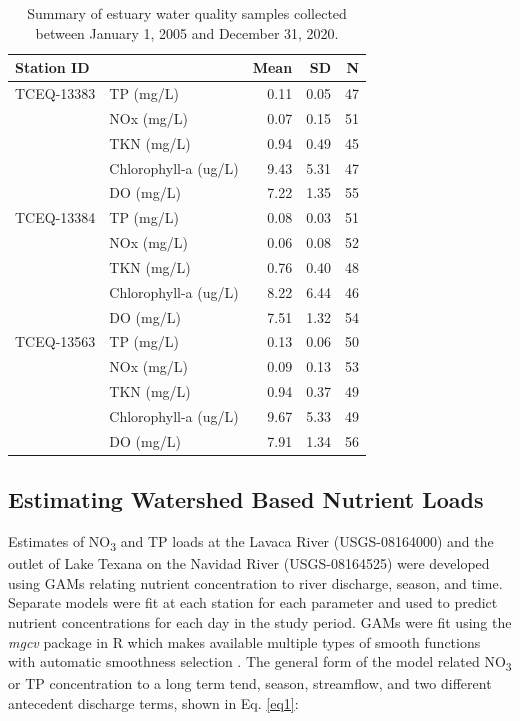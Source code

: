 \documentclass[sn-basic,referee,lineno,pdflatex]{sn-jnl}
\begin{document}
\begin{table}

\caption{\label{tab:table2}Summary of estuary water quality samples collected between January 1, 2005 and December 31, 2020.}
\centering
\begin{tabular}[t]{llrrr}
\toprule
Station ID &   & Mean & SD & N\\
\midrule
TCEQ-13383 & TP (mg/L) & \num{0.11} & \num{0.05} & 47\\
 & NOx (mg/L) & \num{0.07} & \num{0.15} & 51\\
 & TKN (mg/L) & \num{0.94} & \num{0.49} & 45\\
 & Chlorophyll-a (ug/L) & \num{9.43} & \num{5.31} & 47\\
 & DO (mg/L) & \num{7.22} & \num{1.35} & 55\\
TCEQ-13384 & TP (mg/L) & \num{0.08} & \num{0.03} & 51\\
 & NOx (mg/L) & \num{0.06} & \num{0.08} & 52\\
 & TKN (mg/L) & \num{0.76} & \num{0.40} & 48\\
 & Chlorophyll-a (ug/L) & \num{8.22} & \num{6.44} & 46\\
 & DO (mg/L) & \num{7.51} & \num{1.32} & 54\\
TCEQ-13563 & TP (mg/L) & \num{0.13} & \num{0.06} & 50\\
 & NOx (mg/L) & \num{0.09} & \num{0.13} & 53\\
 & TKN (mg/L) & \num{0.94} & \num{0.37} & 49\\
 & Chlorophyll-a (ug/L) & \num{9.67} & \num{5.33} & 49\\
 & DO (mg/L) & \num{7.91} & \num{1.34} & 56\\
\bottomrule
\end{tabular}
\end{table}

\hypertarget{estimating-watershed-based-nutrient-loads}{%
\subsection{Estimating Watershed Based Nutrient
Loads}\label{estimating-watershed-based-nutrient-loads}}

Estimates of NO\textsubscript{3} and TP loads at the Lavaca River
(USGS-08164000) and the outlet of Lake Texana on the Navidad River
(USGS-08164525) were developed using GAMs relating nutrient
concentration to river discharge, season, and time. Separate models were
fit at each station for each parameter and used to predict nutrient
concentrations for each day in the study period. GAMs were fit using the
\emph{mgcv} package in R which makes available multiple types of smooth
functions with automatic smoothness selection
\citep{woodFastStableRestricted2011}. The general form of the model
related NO\textsubscript{3} or TP concentration to a long term tend,
season, streamflow, and two different antecedent discharge terms, shown
in Eq. \ref{eq1}:
\end{document}
